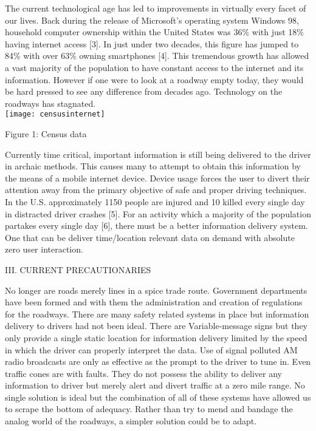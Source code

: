 \documentclass[11pt]{article}
\begin{document}
\begin{multicols}{2}
\begin{center}
\end{center}
The current technological age has led to improvements in virtually every facet of our lives. Back during the release of Microsoft's operating system Windows 98, household computer ownership within the United States was 36\% with just 18\% having internet access [3]. In just under two decades, this figure has jumped to 84\% with over 63\% owning smartphones [4]. This tremendous growth has allowed a vast majority of the population to have constant access to the internet and its information. However if one were to look at a roadway empty today, they would be hard pressed to see any difference from decades ago. Technology on the roadways has stagnated.
\\
\texttt{[image: censusinternet]}
\begin{center}
{\footnotesize Figure 1: Census data}
\end{center}
Currently time critical, important information is still being delivered to the driver in archaic methods. This causes many to attempt to obtain this information by the means of a mobile internet device. Device usage forces the user to divert their attention away from the primary objective of safe and proper driving techniques. In the U.S. approximately 1150 people are injured and 10 killed every single day in distracted driver crashes [5]. For an activity which a majority of the population partakes every single day [6], there must be a better information delivery system. One that can be deliver time/location relevant data on demand with absolute zero user interaction.  
\begin{center}
	III. CURRENT PRECAUTIONARIES
\end{center}
No longer are roads merely lines in a spice trade route. Government departments have been formed and with them the administration and creation of regulations for the roadways. There are many safety related systems in place but information delivery to drivers had not been ideal. There are Variable-message signs but they only provide a single static location for information delivery limited by the speed in which the driver can properly interpret the data. Use of signal polluted AM radio broadcasts are only as effective as the prompt to the driver to tune in. Even traffic cones are with faults. They do not possess the ability to deliver any information to driver but merely alert and divert traffic at a zero mile range. No single solution is ideal but the combination of all of these systems have allowed us to scrape the bottom of adequacy. Rather than try to mend and bandage the analog world of the roadways, a simpler solution could be to adapt.

\end{multicols}
\end{document}
